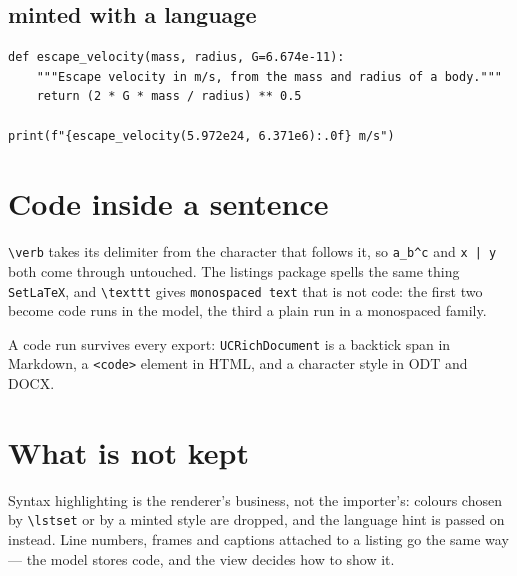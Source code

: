 \documentclass[11pt]{article}
\begin{document}
\subsection{minted with a language}
\begin{verbatim}
def escape_velocity(mass, radius, G=6.674e-11):
    """Escape velocity in m/s, from the mass and radius of a body."""
    return (2 * G * mass / radius) ** 0.5

print(f"{escape_velocity(5.972e24, 6.371e6):.0f} m/s")
\end{verbatim}

\section{Code inside a sentence}
\texttt{\textbackslash verb} takes its delimiter from the character that
follows it, so
\verb|a_b^c| and \verb+x | y+ both come through untouched. The listings
package spells the same thing \lstinline{SetLaTeX}, and
\texttt{\textbackslash texttt} gives \texttt{monospaced text} that is not
code: the first two become code runs in the model, the third a plain run in
a monospaced family.

A code run survives every export: \lstinline{UCRichDocument} is a backtick
span in Markdown, a \texttt{<code>} element in HTML, and a character style
in ODT and DOCX.

\section{What is not kept}
Syntax highlighting is the renderer's business, not the importer's: colours
chosen by \texttt{\textbackslash lstset} or by a minted style are dropped,
and the language hint is passed on instead. Line numbers, frames and captions
attached to a listing go the same way --- the model stores code, and the
view decides how to show it.
\end{document}
